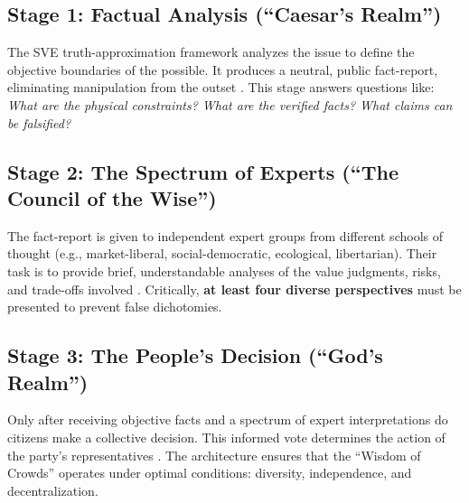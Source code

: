\documentclass[11pt,a4paper]{article}
\begin{document}
\subsection{Stage 1: Factual Analysis (``Caesar's Realm'')}
The SVE truth-approximation framework analyzes the issue to define the objective boundaries of the possible. It produces a neutral, public fact-report, eliminating manipulation from the outset \citep[lines 3409--3411, 3488--3489]{AnalyticalReport2025}. This stage answers questions like: \textit{What are the physical constraints? What are the verified facts? What claims can be falsified?}

\subsection{Stage 2: The Spectrum of Experts (``The Council of the Wise'')}
The fact-report is given to independent expert groups from different schools of thought (e.g., market-liberal, social-democratic, ecological, libertarian). Their task is to provide brief, understandable analyses of the value judgments, risks, and trade-offs involved \citep[lines 3412--3414, 3488--3489]{AnalyticalReport2025}. Critically, \textbf{at least four diverse perspectives} must be presented to prevent false dichotomies.

\subsection{Stage 3: The People's Decision (``God's Realm'')}
Only after receiving objective facts and a spectrum of expert interpretations do citizens make a collective decision. This informed vote determines the action of the party's representatives \citep[lines 3415--3416, 3488--3489]{AnalyticalReport2025}. The architecture ensures that the ``Wisdom of Crowds'' operates under optimal conditions: diversity, independence, and decentralization.
\end{document}
